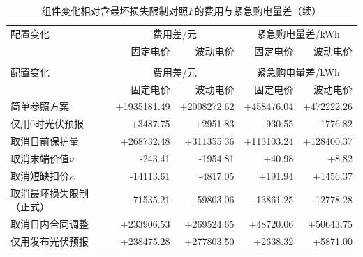 \begingroup
\setlength{\tabcolsep}{6pt}
\Needspace{0.35\textheight}
\begin{longtable}{p{}rrrr}
\caption{组件变化相对含最坏损失限制对照$F$的费用与紧急购电量差}\label{tab:ablation}\\
\toprule
配置变化 & \multicolumn{2}{c}{费用差/元} & \multicolumn{2}{c}{紧急购电量差/kWh}\\
 & 固定电价 & 波动电价 & 固定电价 & 波动电价\\
\midrule\endfirsthead
\caption{组件变化相对含最坏损失限制对照$F$的费用与紧急购电量差（续）}\\
\toprule 配置变化 & \multicolumn{2}{c}{费用差/元} & \multicolumn{2}{c}{紧急购电量差/kWh}\\
 & 固定电价 & 波动电价 & 固定电价 & 波动电价\\
\midrule\endhead\bottomrule\endfoot
简单参照方案 & +1935181.49 & +2008272.62 & +458476.04 & +472222.26 \\
仅用0时光伏预报 & +3487.75 & +2951.83 & -930.55 & -1776.82 \\
取消日前保护量 & +268732.48 & +311355.36 & +113103.24 & +128400.37 \\
取消末端价值$\nu$ & -243.41 & -1954.81 & +40.98 & +8.82 \\
取消短缺扣价$\kappa$ & -14113.61 & -4817.05 & +191.94 & +1456.37 \\
取消最坏损失限制（正式） & -71535.21 & -59803.06 & -13861.25 & -12778.28 \\
取消日内合同调整 & +233906.53 & +269524.65 & +48720.06 & +50643.75 \\
仅用发布光伏预报 & +238475.28 & +277803.50 & +2638.32 & +5871.00 \\
\end{longtable}
\endgroup
